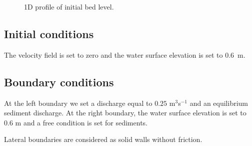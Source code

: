 \begin{figure}[H]
 \centering
 \caption{1D profile of initial bed level.}
 \label{fig:bosse-t2d:bottom}
\end{figure}

\subsection{Initial conditions}
%
The velocity field is set to zero and the water surface elevation is set to $0.6$~m.
%
\subsection{Boundary conditions}
%
At the left boundary we set a discharge equal to $0.25$ m$^3$s$^{-1}$ and an equilibrium sediment discharge. At the right boundary, the water surface elevation is set to $0.6$ m and a free condition is set for sediments.

Lateral boundaries are considered as solid walls without friction.
%

%

